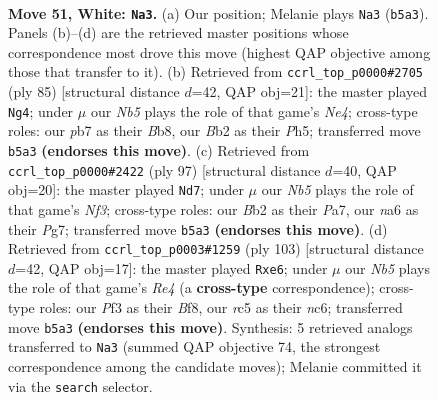 \documentclass[11pt]{article}
\begin{document}
\clearpage

\begin{figure}[p]\centering
\begin{subfigure}{0.46\textwidth}\centering
\resizebox{\linewidth}{!}{%
\newchessgame
\chessboard[
  setfen={8/1p2p1k1/n5pp/pNr5/P1p2K2/2P2P2/1B1R4/8 w - - 7 51},
  showmover=false,
  pgfstyle=straightmove, color=movearrow, markmove={b5-a3}
]}
\caption{}
\end{subfigure}\hfill
\begin{subfigure}{0.46\textwidth}\centering
\resizebox{\linewidth}{!}{%
\newchessgame
\chessboard[
  setfen={1b6/5p2/p1k2p2/P3n2p/1P3P2/1KP5/3R3P/8 b - - 0 43},
  showmover=false,
  pgfstyle=straightmove, color=movearrow, markmove={e5-g4}
]}
\caption{}
\end{subfigure}
\\[4pt]
\begin{subfigure}{0.46\textwidth}\centering
\resizebox{\linewidth}{!}{%
\newchessgame
\chessboard[
  setfen={6k1/p5p1/5n2/2RpP2p/1p6/6PP/PP2N1K1/3r4 b - - 0 49},
  showmover=false,
  pgfstyle=straightmove, color=movearrow, markmove={f6-d7}
]}
\caption{}
\end{subfigure}\hfill
\begin{subfigure}{0.46\textwidth}\centering
\resizebox{\linewidth}{!}{%
\newchessgame
\chessboard[
  setfen={5bk1/8/2NnP1p1/4r2p/5p1P/8/2N2PP1/5RK1 b - - 0 52},
  showmover=false,
  pgfstyle=straightmove, color=movearrow, markmove={e5-e6}
]}
\caption{}
\end{subfigure}
\caption{\textbf{Move 51, White: \texttt{Na3}.} (a) Our position; Melanie plays \texttt{Na3} (\texttt{b5a3}). Panels (b)--(d) are the retrieved master positions whose correspondence most drove this move (highest QAP objective among those that transfer to it). (b) Retrieved from \texttt{ccrl\_top\_p0000\#2705} (ply 85) [structural distance $d$=42, QAP obj=21]: the master played \texttt{Ng4}; under $\mu$ our \emph{Nb5} plays the role of that game's \emph{Ne4}; cross-type roles: our \emph{p}b7 as their \emph{B}b8, our \emph{B}b2 as their \emph{P}h5; transferred move \texttt{b5a3} \textbf{(endorses this move)}. (c) Retrieved from \texttt{ccrl\_top\_p0000\#2422} (ply 97) [structural distance $d$=40, QAP obj=20]: the master played \texttt{Nd7}; under $\mu$ our \emph{Nb5} plays the role of that game's \emph{Nf3}; cross-type roles: our \emph{B}b2 as their \emph{P}a7, our \emph{n}a6 as their \emph{P}g7; transferred move \texttt{b5a3} \textbf{(endorses this move)}. (d) Retrieved from \texttt{ccrl\_top\_p0003\#1259} (ply 103) [structural distance $d$=42, QAP obj=17]: the master played \texttt{Rxe6}; under $\mu$ our \emph{Nb5} plays the role of that game's \emph{Re4} (a \textbf{cross-type} correspondence); cross-type roles: our \emph{P}f3 as their \emph{B}f8, our \emph{r}c5 as their \emph{n}c6; transferred move \texttt{b5a3} \textbf{(endorses this move)}. Synthesis: 5 retrieved analogs transferred to \texttt{Na3} (summed QAP objective 74, the strongest correspondence among the candidate moves); Melanie committed it via the \texttt{search} selector.}
\label{fig:thought-m100}
\end{figure}
\end{document}
